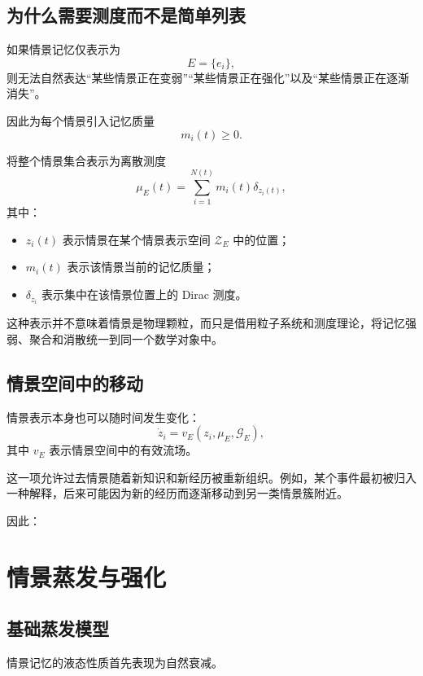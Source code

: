 \subsection{为什么需要测度而不是简单列表}

如果情景记忆仅表示为
\[
E=\{e_i\},
\]
则无法自然表达“某些情景正在变弱”“某些情景正在强化”以及“某些情景正在逐渐消失”。

因此为每个情景引入记忆质量
\[
m_i(t)\geq0.
\]

将整个情景集合表示为离散测度
\[
\boxed{
\mu_E(t)
=
\sum_{i=1}^{N(t)}
m_i(t)
\delta_{z_i(t)},
}
\]
其中：

\begin{itemize}
    \item $z_i(t)$ 表示情景在某个情景表示空间 $\mathcal{Z}_E$ 中的位置；
    \item $m_i(t)$ 表示该情景当前的记忆质量；
    \item $\delta_{z_i}$ 表示集中在该情景位置上的 Dirac 测度。
\end{itemize}

这种表示并不意味着情景是物理颗粒，而只是借用粒子系统和测度理论，将记忆强弱、聚合和消散统一到同一个数学对象中。

\subsection{情景空间中的移动}

情景表示本身也可以随时间发生变化：
\[
\boxed{
\dot z_i
=
v_E
\left(
z_i,
\mu_E,
\mathcal{G}_E
\right),
}
\]
其中 $v_E$ 表示情景空间中的有效流场。

这一项允许过去情景随着新知识和新经历被重新组织。例如，某个事件最初被归入一种解释，后来可能因为新的经历而逐渐移动到另一类情景簇附近。

因此：
\begin{statementbox}
\centering
{}
\end{statementbox}

\section{情景蒸发与强化}

\subsection{基础蒸发模型}

情景记忆的液态性质首先表现为自然衰减。

